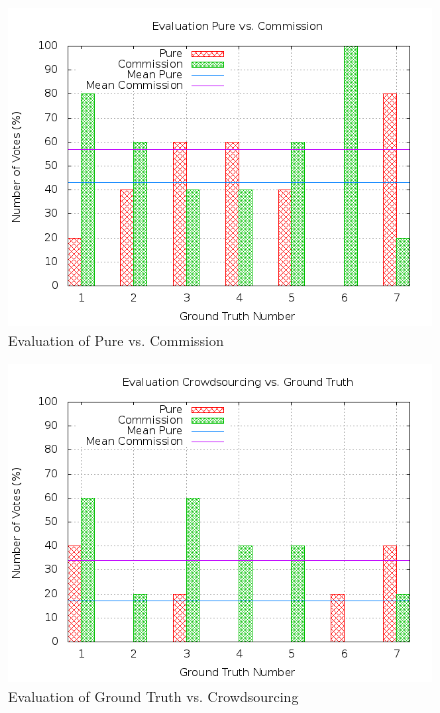 \begin{figure}
\centering
\includegraphics[scale=0.55]{images/plots/crowdsourcing/plot_evaluation_pure_vs_commission.png}
\caption{Evaluation of Pure vs. Commission}
\label{crowdsourcing_desc_length}
\end{figure}
\begin{figure}
\centering
\includegraphics[scale=0.55]{images/plots/crowdsourcing/plot_evaluation_ground_vs_crowd.png}
\caption{Evaluation of Ground Truth vs. Crowdsourcing}
\label{crowdsourcing_desc_length}
\end{figure}
